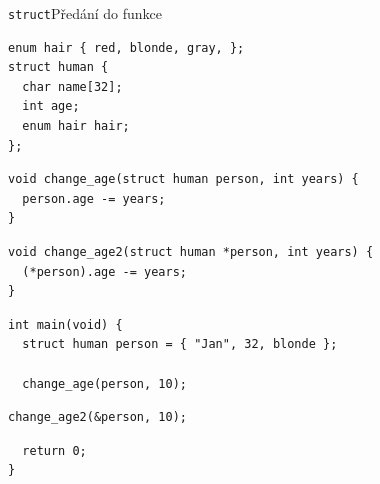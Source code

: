 \begin{frame}[fragile]{\texttt{struct}}{Předání do funkce}

  \begin{lstlisting}
enum hair { red, blonde, gray, };
struct human {
  char name[32];
  int age;
  enum hair hair;
};
  \end{lstlisting}
  \begin{lstlisting}
void change_age(struct human person, int years) {
  person.age -= years;
}
  \end{lstlisting}
  \begin{lstlisting}
void change_age2(struct human *person, int years) {
  (*person).age -= years;
}
  \end{lstlisting}
  \begin{lstlisting}[belowskip=0pt]
int main(void) {
  struct human person = { "Jan", 32, blonde };

  change_age(person, 10);
  \end{lstlisting}
  \begin{lstlisting}[aboveskip=0pt]
  change_age2(&person, 10);
  \end{lstlisting}
  \begin{lstlisting}
  return 0;
}
\end{lstlisting}

\end{frame}

